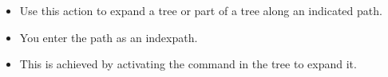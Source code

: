  \begin{itemize}
\item Use this action to expand a tree or part of a tree along an indicated path.
\item You enter the path as an indexpath.
\item This is achieved by activating the command in the tree to expand it. 
\end{itemize} 
